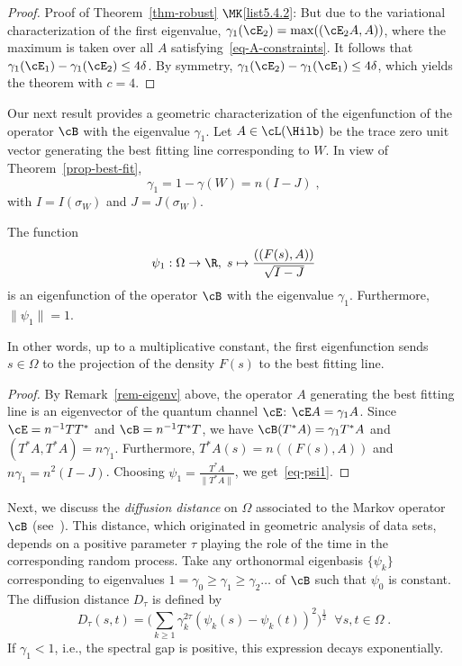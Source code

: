 \begin{proof}{Proof of Theorem~\ref{thm-robust} $\MK$\eqref{list5.4.2}:}
But due to the variational characterization of the first eigenvalue, $\gamma_1(\cE_2) =\linebreak\max ((\cE_2 A,A))$, where the maximum is taken over all $A$ satisfying~\eqref{eq-A-constraints}. It follows that $\gamma_1(\cE_1)- \gamma_1(\cE_2) \leq 4\delta$. By symmetry, $\gamma_1(\cE_2)- \gamma_1(\cE_1) \leq 4\delta$, which yields the theorem with $c= 4$.
\end{proof}




Our next result provides a geometric characterization of the eigenfunction of the operator $\cB$ with the eigenvalue $\gamma_1$. Let $A \in \cL(\Hilb)$ be the trace zero unit vector generating the best fitting line corresponding to $W$. In view of Theorem~\ref{prop-best-fit},
\[
\gamma_1 = 1-\gamma(W)= n(I-J)\;,
\]
with $I= I(\sigma_W)$ and $J=J(\sigma_W)$.
%

\begin{theo}\label{thm-eigenf}
The function
\begin{equation}\label{eq-psi1}
\psi_1: \Omega \to \R,\; s \mapsto \frac{((F(s),A))}{\sqrt{I-J}}
\end{equation}
is an eigenfunction of the operator $\cB$ with the eigenvalue $\gamma_1$. Furthermore, $\|\psi_1\|=1$.
\end{theo}
%
In other words, up to a multiplicative constant, the first eigenfunction sends $s \in \Omega$ to the projection of the density $F(s)$ to the best fitting line.

\begin{proof}
By Remark~\ref{rem-eigenv} above, the operator $A$ generating the
best fitting line is an eigenvector of the quantum channel $\cE$: $\cE A= \gamma_1 A$. Since $\cE=n^{-1}TT^*$ and $\cB= n^{-1}T^*T$, we have $\cB(T^*A)= \gamma_1 T^*A$ and $(T^*A,T^*A) = n\gamma_1$. Furthermore, $T^*A(s)= n((F(s),A))$ and $n\gamma_1 = n^2(I-J)$. Choosing $\psi_1= \frac{T^*A}{\|T^*A\|}$, we get~\eqref{eq-psi1}.
\end{proof}


Next, we discuss the \emph{diffusion distance} on $\Omega$ associated to the Markov operator $\cB$ (see~\cite{CoL}). This distance, which originated in geometric analysis of data sets, depends on a positive parameter $\tau$ playing the role of the time in the corresponding random process. Take any orthonormal eigenbasis $\{\psi_k\}$ corresponding to eigenvalues $1=\gamma_0 \geq \gamma_1 \geq \gamma_2 \dots$ of $\cB$ such that $\psi_0$ is constant. The diffusion distance $D_\tau$ is defined by
\begin{equation}\label{eq-diffusion}
D_\tau(s,t) = \big(\sum_{k \geq 1} \gamma_k ^{2\tau}(\psi_k(s) - \psi_k(t))^2 \big)^{\frac{1}{2}} \;\;\forall s,t \in \Omega\;.
\end{equation}
If $\gamma_1 < 1$, i.e., the spectral gap is positive, this expression decays exponentially.


